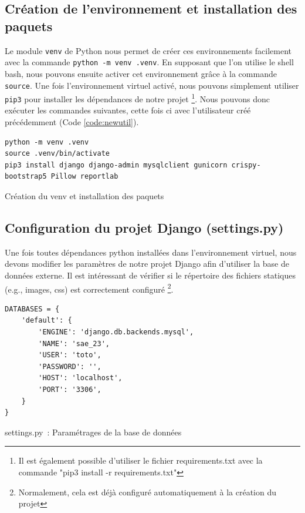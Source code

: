 \documentclass{article}
\begin{document}
        \subsection{Création de l'environnement et installation des paquets}
        Le module \verb|venv| de Python nous permet de créer ces environnements facilement avec la commande \verb|python -m venv .venv|.
        En supposant que l'on utilise le shell bash, nous pouvons ensuite activer cet environnement grâce à la commande \verb|source|.
        Une fois l'environnement virtuel activé, nous pouvons simplement utiliser \verb|pip3| pour installer les dépendances de notre projet
        \footnote{\label{note2}Il est également possible d'utiliser le fichier requirements.txt avec la commande "pip3 install -r requirements.txt"}. 
        Nous pouvons donc exécuter les commandes suivantes, cette fois ci avec l'utilisateur créé précédemment (Code \ref{code:newutil}). 
        \begin{listing}[H]
            \begin{verbatim}
python -m venv .venv
source .venv/bin/activate
pip3 install django django-admin mysqlclient gunicorn crispy-bootstrap5 Pillow reportlab
            \end{verbatim}
            \caption{Création du venv et installation des paquets}
            \label{code:creation-venv}
        \end{listing}
        
        \subsection{Configuration du projet Django (settings.py)}
        Une fois toutes dépendances python installées dans l'environnement virtuel, nous devons modifier les paramètres de notre projet Django afin d'utiliser la base de données externe.
        Il est intéressant de vérifier si le répertoire des fichiers statiques (e.g., images, css) est correctement configuré
        \footnote{\label{note3}Normalement, cela est déjà configuré automatiquement à la création du projet}. 
        \begin{listing}[H]
            \begin{verbatim}
DATABASES = {
    'default': {
        'ENGINE': 'django.db.backends.mysql',
        'NAME': 'sae_23',
        'USER': 'toto',
        'PASSWORD': '',
        'HOST': 'localhost',
        'PORT': '3306',
    }
}
            \end{verbatim}
            \caption{settings.py : Paramétrages de la base de données}
            \label{code:settings.py-db}
        \end{listing}
        
\end{document}
